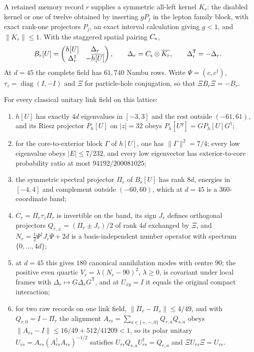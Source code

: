 \documentclass[11pt]{article}
\begin{document}
A retained memory record \(r\) supplies a symmetric all-left kernel \(K_r\): the disabled
kernel or one of twelve obtained by inserting \(gP_j\) in the lepton family block, with
exact rank-one projectors \(P_j\), an exact interval calculation giving \(g<1\), and
\(\|K_r\|\le1\). With the staggered spatial pairing \(C_{\rm s}\),
\[
 B_r[U]=\begin{pmatrix}h[U]&\Delta_r\\ \Delta_r^\dagger&-\overline{h[U]}\end{pmatrix},
 \qquad \Delta_r=C_{\rm s}\otimes\overline{K_r},\qquad \Delta_r^{\mathsf T}=-\Delta_r .
\]
At \(d=45\) the complete field has \(61{,}740\) Nambu rows. Write \(\Psi=(c,c^\dagger)\),
\(\tau_z=\operatorname{diag}(I,-I)\) and \(\Xi\) for particle-hole conjugation, so that
\(\Xi B_r\Xi=-B_r\).

\begin{proposition}
\label{prop:gauge-band}
For every classical unitary link field on this lattice:
\begin{enumerate}[label=\textup{(\roman*)},leftmargin=2em]
\item \(h[U]\) has exactly \(4d\) eigenvalues in \([-3,3]\) and the rest outside
\((-61,61)\), and its Riesz projector \(P_h[U]\) on \(|z|=32\) obeys
\(P_h[U^g]=GP_h[U]G^\dagger\);
\item for the core-to-exterior block \(\Gamma\) of \(h[U]\), one has \(\|\Gamma\|^2=7/4\);
every low eigenvalue obeys \(|E|\le7/232\), and every low eigenvector has
exterior-to-core probability ratio at most \(94192/200081025\);
\item the symmetric spectral projector \(\Pi_r\) of \(B_r[U]\) has rank \(8d\), energies
in \([-4,4]\) and complement outside \((-60,60)\), which at \(d=45\) is a
\(360\)-coordinate band;
\item \(C_r=\Pi_r\tau_z\Pi_r\) is invertible on the band, its sign \(J_r\) defines orthogonal
projectors \(Q_{r,\pm}=(\Pi_r\pm J_r)/2\) of rank \(4d\) exchanged by \(\Xi\), and
\(N_r=\tfrac12\Psi^\dagger J_r\Psi+2d\) is a basis-independent number operator with spectrum
\(\{0,\dots,4d\}\);
\item at \(d=45\) this gives \(180\) canonical annihilation modes with centre \(90\); the
positive even quartic \(V_r=\lambda(N_r-90)^2\), \(\lambda\ge0\), is covariant under local
frames with \(\Delta_r\mapsto G\Delta_rG^{\mathsf T}\), and at \(U_{xy}=I\) it equals the
original compact interaction;
\item for two raw records on one link field, \(\|\Pi_r-\Pi_s\|\le4/49\), and with
\(Q_{r,0}=I-\Pi_r\) the alignment \(A_{rs}=\sum_{a\in\{+,-,0\}}Q_{r,a}Q_{s,a}\) obeys
\(\|A_{rs}-I\|\le16/49+512/41209<1\), so its polar unitary
\(U_{rs}=A_{rs}(A_{rs}^\dagger A_{rs})^{-1/2}\) satisfies
\(U_{rs}Q_{s,a}U_{rs}^\dagger=Q_{r,a}\) and \(\Xi U_{rs}\Xi=U_{rs}\).
\end{enumerate}
\end{proposition}
\end{document}
